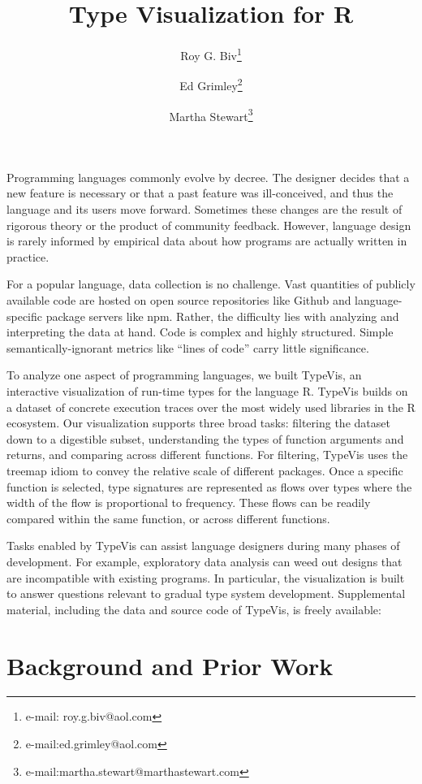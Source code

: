 \documentclass{vgtc}                          %
\title{Type Visualization for R}
\author{Roy G. Biv\thanks{e-mail: roy.g.biv@aol.com} %
\and Ed Grimley\thanks{e-mail:ed.grimley@aol.com} %
\and Martha Stewart\thanks{e-mail:martha.stewart@marthastewart.com}}
\affiliation{\scriptsize Northeastern University}
\begin{document}

\maketitle

Programming languages commonly evolve by decree. The designer
decides that a new feature is necessary or that a past feature was
ill-conceived, and thus the language and its users move forward.
Sometimes these changes are the result of rigorous theory
or the product of community feedback. However, language design is
rarely informed by empirical data about how programs are actually
written in practice.

For a popular language, data collection is no challenge. Vast
quantities of publicly available code are hosted on open source
repositories like Github and language-specific package servers like npm.
Rather, the difficulty lies with analyzing and interpreting the data
at hand. Code is complex and highly structured. Simple
semantically-ignorant metrics like ``lines of code''
carry little significance.

To analyze one aspect of programming languages, we built {\sc TypeVis},
an interactive visualization of run-time types for the language R.
{\sc TypeVis} builds on a dataset of concrete execution traces
over the most widely used libraries in the R ecosystem.
Our visualization supports three broad tasks:
filtering the dataset down to a digestible subset,
understanding the types of function arguments and returns,
and comparing across different functions.
For filtering, {\sc TypeVis} uses the treemap idiom
to convey the relative scale of different packages.
Once a specific function is selected,
type signatures are represented as flows over types
where the width of the flow is proportional to frequency.
These flows can be readily compared within the same function,
or across different functions.

Tasks enabled by {\sc TypeVis} can assist language designers
during many phases of development.
For example, exploratory data analysis can weed out designs that
are incompatible with existing programs.
In particular, the visualization is built to answer questions
relevant to gradual type system development.
Supplemental material, including the data and source code of
{\sc TypeVis}, is freely available: 


\section{Background and Prior Work}
\end{document}
